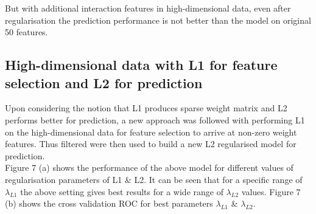 \documentclass[paper=a4,fontsize=12pt]{article}
\begin{document}
But with additional interaction features in high-dimensional data, even after regularisation the prediction performance is not better than the model on original 50 features.


\subsection{High-dimensional data with L1 for feature selection and L2 for prediction}
Upon considering the notion that L1 produces sparse weight matrix and L2 performs better for prediction, a new approach was followed with performing L1 on the high-dimensional data for feature selection to arrive at non-zero weight features. Thus filtered were then used to build a new L2 regularised model for prediction. \\

Figure 7 (a) shows the performance of the above model for different values of regularisation parameters of L1 \& L2. It can be seen that for a specific range of $\lambda_{L1}$ the above setting gives best results for a wide range of $\lambda_{L2}$ values.
Figure 7 (b) shows the cross validation ROC for best parameters $\lambda_{L1}$ \& $\lambda_{L2}$.
\end{document}
